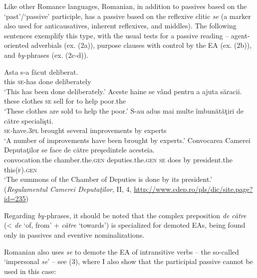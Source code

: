 \documentclass[output=paper]{langsci/langscibook}
\begin{document}
Like other Romance languages, Romanian, in addition to passives based on the ‘past'/‘passive' participle, has a passive based on the reflexive clitic \textit{se} (a marker also used for anticausatives, inherent reflexives, and middles). The following sentences exemplify this type, with the usual tests for a passive reading – agent-oriented adverbials (ex. (2a)), purpose clauses with control by the EA (ex. (2b)), and \textit{by-}phrases (ex. (2c-d)).   

\ea%
    \label{ex:giurgea:2}%
    \ea
    \gll Asta s-a      făcut deliberat.\\
         this  \textsc{se}{}-has done  deliberately\\
    \glt ‘This has been done deliberately.’
    \ex
    \gll Aceste haine   se vând pentru a ajuta săracii.\\
         these   clothes \textsc{se} sell   for      to help poor.the\\
    \glt  ‘These clothes are sold to help the poor.’
    \ex
    \gll S{}-au              adus     {mai multe} îmbunătăţiri    {de către} specialişti.\\
         \textsc{se}\textit{{}-}have.\textsc{3pl} brought several      improvements by         experts\\
    \glt ‘A number of improvements have been brought by experts.’
    \ex
    \gll Convocarea      Camerei                Deputaţilor           se  face {de către} preşedintele  acesteia.\\
         convocation.the chamber.the.\textsc{gen} deputies.the.\textsc{gen}  \textsc{se} does by    president.the this(\textsc{f).gen}\\
    \glt ‘The summons of the Chamber of Deputies is done by its president.’\\
    (\textit{Regulamentul Camerei Deputaţilor}, II, 4, \url{http://www.cdep.ro/pls/dic/site.page?id=235})\\
    \z
\z

Regarding \textit{by-}phrases, it should be noted that the complex preposition \textit{de către} (< \textit{de} ‘of, from’ + \textit{către} ‘towards’) is specialized for demoted EAs, being found only in passives and eventive nominalizations.

Romanian also uses \textit{se} to demote the EA of intransitive verbs – the so-called ‘impersonal \textit{se}' – see (3), where I also show that the participial passive cannot be used in this case:
\end{document}
